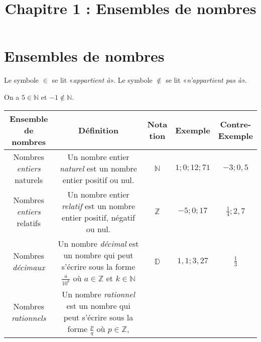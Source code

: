 \documentclass[11pt]{article}
\title{Chapitre 1 : Ensembles de nombres}
\date{}
\author{}
\begin{document}
\maketitle\thispagestyle{fancy}

\section{Ensembles de nombres}
\begin{notation}
  Le symbole $\in$ se lit «\emph{appartient à}». Le symbole $\notin$ se lit
  «\emph{n'appartient pas à}».
\end{notation}
\begin{exemple}
  On a $5\in\mathbb{N}$ et $-1\notin\mathbb{N}$.
\end{exemple}
\noindent
\begin{center}
\begin{tabular}{|c|c|c|c|c|}
  \hline
  \makecell{\textbf{Ensemble de}\\\textbf{nombres}} & \textbf{Définition} &
  \makecell{\textbf{Nota}\\\textbf{tion}} & \textbf{Exemple} &
  \makecell{\textbf{Contre-}\\\textbf{Exemple}}\\
  \hline
  \makecell{Nombres \emph{entiers}\\naturels} & \makecell{Un nombre entier \emph{naturel}
est un nombre\\entier positif ou nul.} & $\mathbb{N}$ & $1; 0; 12; 71$ & $-3;
0,5$ \\
  \hline
  \makecell{Nombres \emph{entiers}\\relatifs} & \makecell{Un nombre entier
    \emph{relatif} est un nombre\\entier positif, négatif ou nul.} &
    $\mathbb{Z}$ & $-5;0;17$  & $\frac{1}{4}; 2,7$ \\
  \hline
  \makecell{Nombres \\\emph{décimaux}} & \makecell{Un nombre \emph{décimal} est
  un nombre\\qui peut s'écrire sous la forme $\frac{a}{10^k}$\\où
  $a\in\mathbb{Z}$ et $k\in\mathbb{N}$} & $\mathbb{D}$ & $1,1;3,27$ &
  $\frac{1}{3}$\\
  \hline
  \makecell{Nombres \\\emph{rationnels}} & \makecell{Un nombre \emph{rationnel} est
  un nombre\\qui peut s'écrire sous la forme $\frac{p}{q}$\\où $p\in\mathbb{Z}$,
}
\end{tabular}
\end{center}
\end{document}
